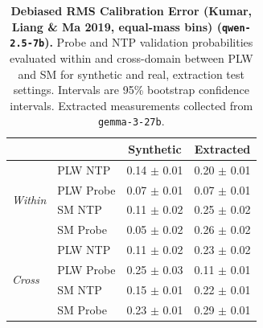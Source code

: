 \begin{table}[ht]
\centering
\begin{tabular}{ll cc}
\toprule
& & Synthetic & Extracted \\
\midrule
\multirow{4}{*}{\textit{Within}}
& PLW NTP & 0.14 $\pm$ 0.01 & 0.20 $\pm$ 0.01 \\
& PLW Probe & 0.07 $\pm$ 0.01 & 0.07 $\pm$ 0.01 \\
& SM NTP & 0.11 $\pm$ 0.02 & 0.25 $\pm$ 0.02 \\
& SM Probe & 0.05 $\pm$ 0.02 & 0.26 $\pm$ 0.02 \\
\midrule
\multirow{4}{*}{\textit{Cross}}
& PLW NTP & 0.11 $\pm$ 0.02 & 0.23 $\pm$ 0.02 \\
& PLW Probe & 0.25 $\pm$ 0.03 & 0.11 $\pm$ 0.01 \\
& SM NTP & 0.15 $\pm$ 0.01 & 0.22 $\pm$ 0.01 \\
& SM Probe & 0.23 $\pm$ 0.01 & 0.29 $\pm$ 0.01 \\
\bottomrule
\end{tabular}
\caption{\textbf{Debiased RMS Calibration Error (Kumar, Liang \& Ma 2019, equal-mass bins) (\texttt{qwen-2.5-7b}).} Probe and NTP validation probabilities evaluated within and cross-domain between PLW and SM for synthetic and real, extraction test settings. Intervals are 95\% bootstrap confidence intervals. Extracted measurements collected from \texttt{gemma-3-27b}.}
\label{tab:qwen-2.5-7b-gemma-3-27b-pond_supermat-rmsce_db}
\end{table}
